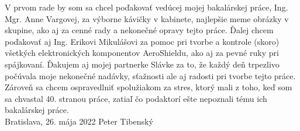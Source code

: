 \null
\vfill
\noindent

V prvom rade by som sa chcel poďakovať vedúcej mojej bakalárskej práce, Ing. Mgr. Anne Vargovej, za výborne kávičky v kabinete, najlepšie meme obrázky v skupine, ako aj za cenné rady a nekonečné opravy tejto práce. Ďalej chcem poďakovať aj Ing. Erikovi Mikulášovi za pomoc pri tvorbe a kontrole (skoro) všetkých elektronických komponentov AeroShieldu, ako aj za pevné ruky pri spájkovaní. Ďakujem aj mojej partnerke Slávke za to, že každý deň trpezlivo počúvala moje nekonečné nadávky, sťažnosti ale aj radosti pri tvorbe tejto práce. Zároveň sa chcem ospravedlniť spolužiakom za stres, ktorý mali z toho, keď som sa chvastal 40. stranou práce, zatiaľ čo podaktorí ešte nepoznali tému ich bakalárskej práce.\\

\noindent Bratislava, 26. mája 2022 \hfill  Peter Tibenský
\cleardoublepage


	

